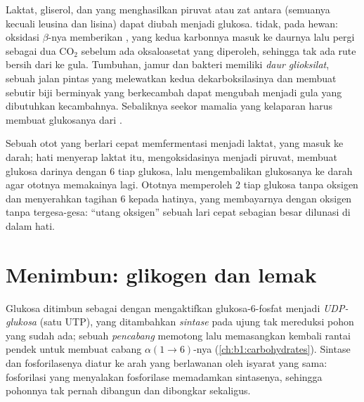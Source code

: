 \begin{proposition}\label{prop:b1:biosyntheses-integration:cannot}
Laktat, gliserol, dan  yang menghasilkan piruvat atau zat
antara  (semuanya kecuali leusina dan lisina) dapat diubah
menjadi glukosa.  tidak, pada hewan: oksidasi $\beta$-nya
memberikan , yang kedua karbonnya masuk ke daurnya lalu pergi
sebagai dua $\mathrm{CO_2}$ sebelum ada oksaloasetat yang diperoleh,
sehingga tak ada rute bersih dari  ke gula. Tumbuhan, jamur
dan bakteri memiliki \emph{daur glioksilat}, sebuah jalan pintas yang
melewatkan kedua dekarboksilasinya dan membuat sebutir biji berminyak
yang berkecambah dapat mengubah  menjadi gula yang dibutuhkan
kecambahnya. Sebaliknya seekor mamalia yang kelaparan harus membuat
glukosanya dari .
\end{proposition}

\begin{example}\label{ex:b1:biosyntheses-integration:cori}
Sebuah otot yang berlari cepat memfermentasi  menjadi
laktat, yang masuk ke darah; hati menyerap laktat itu, mengoksidasinya
menjadi piruvat, membuat glukosa darinya dengan 6  tiap glukosa,
lalu mengembalikan glukosanya ke darah agar ototnya memakainya lagi.
Ototnya memperoleh 2  tiap glukosa tanpa oksigen dan menyerahkan
tagihan 6 kepada hatinya, yang membayarnya dengan oksigen tanpa
tergesa-gesa: ``utang oksigen'' sebuah lari cepat sebagian besar dilunasi
di dalam hati.
\end{example}

\section{Menimbun: glikogen dan lemak}

\begin{definition}\label{def:b1:biosyntheses-integration:glycogensynthesis}
Glukosa ditimbun sebagai  dengan mengaktifkan
glukosa-6-fosfat menjadi \emph{UDP-glukosa} (satu UTP), yang
ditambahkan \emph{ sintase} pada ujung tak mereduksi pohon yang
sudah ada; sebuah \emph{ pencabang} memotong lalu memasangkan
kembali rantai pendek untuk membuat cabang $\alpha(1{\to}6)$-nya
(\cref{ch:b1:carbohydrates}). Sintase dan fosforilasenya diatur ke arah
yang berlawanan oleh isyarat yang sama: fosforilasi yang menyalakan
fosforilase memadamkan sintasenya, sehingga pohonnya tak pernah
dibangun dan dibongkar sekaligus.
\end{definition}

